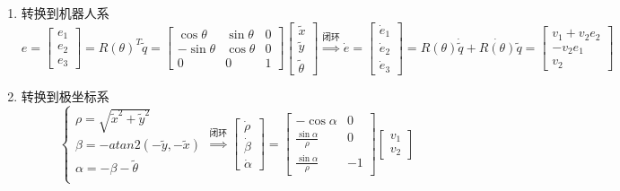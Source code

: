 \documentclass[
12pt, %
a4paper, 
oneside, %
headinclude,footinclude, %
]{scrartcl}
\begin{document}
\begin{enumerate}
\item 转换到机器人系
$$ 
e = \begin{bmatrix} e_1 \\ e_2 \\ e_3 \end{bmatrix} = R(\theta)^T \tilde{q} = \begin{bmatrix} \cos\theta & \sin\theta & 0 \\ -\sin\theta & \cos\theta & 0 \\ 0 & 0 & 1 \end{bmatrix} \begin{bmatrix} \tilde{x} \\ \tilde{y} \\ \tilde{\theta} \end{bmatrix}
\overset{\text{闭环}}{\Longrightarrow}
\dot{e} = \begin{bmatrix} \dot{e}_1 \\ \dot{e}_2 \\ \dot{e}_3 \end{bmatrix} = R(\theta)\dot{\tilde{q}} + \dot{R(\theta)}\tilde{q} = \begin{bmatrix} v_1 + v_2 e_2 \\ -v_2 e_1 \\ v_2 \end{bmatrix} 
$$
\item 转换到极坐标系
$$ 
\begin{cases}
\rho = \sqrt{\tilde{x}^2 + \tilde{y}^2} \\
\beta = -atan2(-\tilde{y}, -\tilde{x}) \\
\alpha = -\beta - \tilde{\theta} \\
\end{cases}
\overset{\text{闭环}}{\Longrightarrow}
\begin{bmatrix} \dot{\rho} \\ \dot{\beta} \\ \dot{\alpha} \end{bmatrix} = 
\begin{bmatrix} -\cos\alpha & 0 \\ \frac{\sin\alpha}{\rho} & 0 \\ \frac{\sin\alpha}{\rho} & -1 \end{bmatrix}
\begin{bmatrix} v_1 \\ v_2 \end{bmatrix}
$$ 
\end{enumerate}
\end{document}

